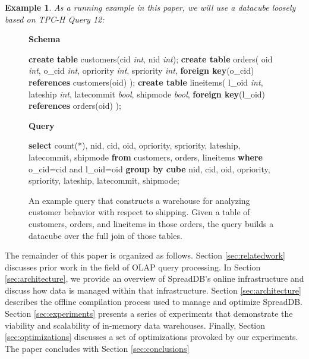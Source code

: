 \documentclass{sig-alternate}
\newtheorem{example}{Example}
\begin{document}
\begin{example}\textit
As a running example in this paper, we will use a datacube loosely based on TPC-H\cite{tpch} Query 12:
\end{example}
\begin{figure}
\begin{center}
\textbf{Schema}
\end{center}
\begin{algorithmic}
\STATE \textbf{create table} customers(cid \textit{int}, nid \textit{int}); 
\STATE \textbf{create table} orders(
\STATE \hspace*{0.1in} oid \textit{int}, o\_cid \textit{int}, opriority \textit{int}, spriority \textit{int},
\STATE \hspace*{0.1in}  \textbf{foreign key}(o\_cid) \textbf{references} customers(oid)
\STATE );
\STATE \textbf{create table} lineitems(
\STATE \hspace*{0.1in} l\_oid \textit{int}, lateship \textit{int}, latecommit \textit{bool}, shipmode \textit{bool},
\STATE \hspace*{0.1in} \textbf{foreign key}(l\_oid) \textbf{references} orders(oid)
\STATE );
\end{algorithmic}
\begin{center}
\textbf{Query}
\end{center}
\begin{algorithmic}
\STATE \textbf{select} count(*),
\STATE \hspace*{0.1in} nid, cid, oid, opriority, spriority, 
\STATE \hspace*{0.1in} lateship, latecommit, shipmode 
\STATE \textbf{from} customers, orders, lineitems 
\STATE \textbf{where} o\_cid=cid and l\_oid=oid 
\STATE \textbf{group by cube} 
\STATE \hspace*{0.1in} nid, cid, oid, opriority, spriority, 
\STATE \hspace*{0.1in} lateship, latecommit, shipmode;
\end{algorithmic}
\caption{An example query that constructs a warehouse for analyzing customer behavior with respect to shipping.  Given a table of customers, orders, and lineitems in those orders, the query builds a datacube over the full join of those tables.}
\label{fig:example}  
\end{figure}

The remainder of this paper is organized as follows.  Section \ref{sec:relatedwork} discusses prior work in the field of OLAP query processing.  In Section \ref{sec:architecture}, we provide an overview of SpreadDB's online infrastructure and discuss how data is managed within that infrastructure.  Section \ref{sec:architecture} describes the offline compilation process used to manage and optimize SpreadDB.  Section \ref{sec:experiments} presents a series of experiments that demonstrate the viability and scalability of in-memory data warehouses.  Finally, Section \ref{sec:optimizations} discusses a set of optimizations provoked by our experiments.  The paper concludes with Section \ref{sec:conclusions}
\end{document}
